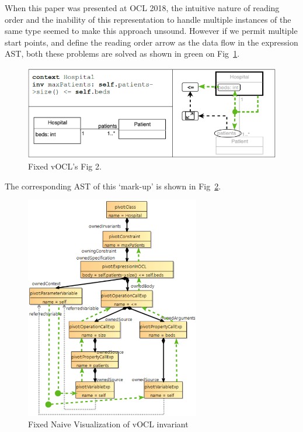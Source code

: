 \documentclass{llncs}
\begin{document}
When this paper was presented at OCL 2018, the intuitive nature of reading order and the inability of this representation to handle multiple instances of the same type seemed to make this approach unsound. However if we permit multiple start points, and define the reading order arrow as the data flow in the expression AST, both these problems are solved as shown in green on Fig~\ref{fig:FixedvOCLFig2}.

\begin{figure}
	\vspace{-10pt}
	\begin{center}
		\includegraphics[width=4.5in]{FixedvOCLFig2.png}
	\end{center}
	\vspace{-10pt}
	\caption{Fixed vOCL's Fig 2.}
	\label{fig:FixedvOCLFig2}
	\vspace{-10pt}
\end{figure}

The corresponding AST of this `mark-up' is shown in Fig~\ref{fig:FixedNaiveInvAST}.

\begin{figure}
	\vspace{-10pt}
	\begin{center}
		\includegraphics[width=3.0in]{FixedvOCLInvASTOverlay.png}
	\end{center}
	\vspace{-10pt}
	\caption{Fixed Naive Visualization of vOCL invariant}
	\label{fig:FixedNaiveInvAST}
	\vspace{-10pt}
\end{figure}
\end{document}
